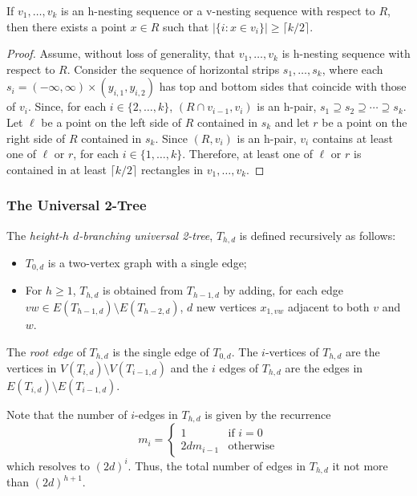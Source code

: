 \documentclass[lotsofwhite]{patmorin}
\begin{document}
\begin{lem}
   If $v_1,\ldots,v_k$ is an h-nesting sequence or a v-nesting sequence
   with respect to $R$, then there exists a point $x\in R$ such that $|\{
   i: x\in v_i \}|\ge \lceil k/2\rceil$.
\end{lem}

\begin{proof}
   Assume, without loss of generality, that $v_1,\ldots,v_k$ is h-nesting
   sequence with respect to $R$.  Consider the sequence of horizontal
   strips $s_1,\ldots,s_k$, where each $s_i=(-\infty,\infty)\times
   (y_{i,1},y_{i,2})$ has top and bottom sides that coincide with those
   of $v_i$. Since, for each $i\in\{2,\ldots,k\}$, $(R\cap v_{i-1},v_i)$
   is an h-pair, $s_1\supseteq s_2\supseteq\cdots\supseteq s_k$.
   Let $\ell$ be a point on the left side of $R$ contained in $s_k$
   and let $r$ be a point on the right side of $R$ contained in $s_k$.
   Since $(R,v_i)$ is an h-pair, $v_i$ contains at least one of $\ell$
   or $r$, for each $i\in\{1,\ldots,k\}$.  Therefore, at least one of
   $\ell$ or $r$ is contained in at least $\lceil k/2\rceil$ rectangles
   in $v_1,\ldots,v_k$.
\end{proof}

\subsubsection{The Universal 2-Tree}

The \emph{height-$h$ $d$-branching universal 2-tree}, $T_{h,d}$ is
defined recursively as follows:
\begin{itemize}
  \item $T_{0,d}$ is a two-vertex graph with a single edge;
  \item For $h\ge 1$, $T_{h,d}$ is obtained from $T_{h-1,d}$ by adding,
     for each edge $vw \in E(T_{h-1,d})\setminus E(T_{h-2,d})$,
     $d$ new vertices $x_{1,vw}$ adjacent to both $v$ and $w$.
\end{itemize}
The \emph{root edge} of $T_{h,d}$ is the single edge of $T_{0,d}$.
The $i$-vertices of $T_{h,d}$ are the vertices in $V(T_{i,d})\setminus
V(T_{i-1,d})$ and the $i$ edges of $T_{h,d}$ are the edges in
$E(T_{i,d})\setminus E(T_{i-1,d})$.

Note that the number of $i$-edges in $T_{h,d}$ is given by the recurrence
\[
   m_i = \begin{cases}
           1 & \text{if $i=0$} \\
           2dm_{i-1} & \text{otherwise}
       \end{cases}
\]
which resolves to $(2d)^{i}$.  Thus, the total number of edges in
$T_{h,d}$ it not more than $(2d)^{h+1}$.
\end{document}

